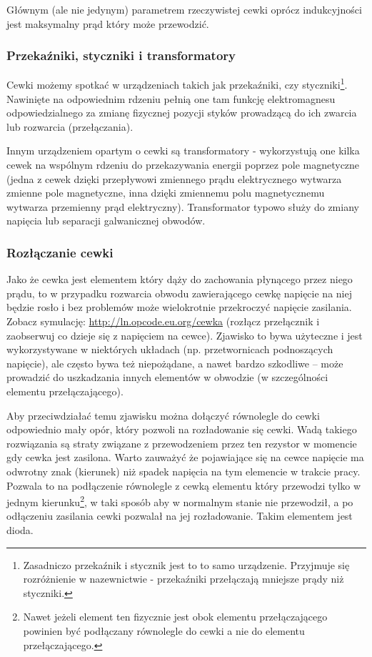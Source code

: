 Głównym (ale nie jedynym) parametrem rzeczywistej cewki oprócz indukcyjności jest maksymalny prąd który może przewodzić.

\subsubsection{Przekaźniki, styczniki i transformatory}

Cewki możemy spotkać w urządzeniach takich jak przekaźniki, czy styczniki\footnote{Zasadniczo przekaźnik i stycznik jest to to samo urządzenie. Przyjmuje się rozróżnienie w nazewnictwie - przekaźniki przełączają mniejsze prądy niż styczniki.}.
Nawinięte na odpowiednim rdzeniu pełnią one tam funkcję elektromagnesu odpowiedzialnego za zmianę fizycznej pozycji styków prowadzącą do ich zwarcia lub rozwarcia (przełączania).

Innym urządzeniem opartym o cewki są transformatory - wykorzystują one kilka cewek na wspólnym rdzeniu do przekazywania energii poprzez pole magnetyczne (jedna z cewek dzięki przepływowi zmiennego prądu elektrycznego wytwarza zmienne pole magnetyczne, inna dzięki zmiennemu polu magnetycznemu wytwarza przemienny prąd elektryczny). Transformator typowo służy do zmiany napięcia lub separacji galwanicznej obwodów.

\subsubsection{Rozłączanie cewki}

Jako że cewka jest elementem który dąży do zachowania płynącego przez niego prądu, to w przypadku rozwarcia obwodu zawierającego cewkę napięcie na niej będzie rosło i bez problemów może wielokrotnie przekroczyć napięcie zasilania.
Zobacz symulację: \url{http://ln.opcode.eu.org/cewka} (rozłącz przełącznik i zaobserwuj co dzieje się z napięciem na cewce).
Zjawisko to bywa użyteczne i jest wykorzystywane w niektórych układach (np. przetwornicach podnoszących napięcie), ale często bywa też niepożądane, a nawet bardzo szkodliwe – może prowadzić do uszkadzania innych elementów w obwodzie (w szczególności elementu przełączającego).

Aby przeciwdziałać temu zjawisku można dołączyć równolegle do cewki odpowiednio mały opór, który pozwoli na rozładowanie się cewki.
Wadą takiego rozwiązania są straty związane z przewodzeniem przez ten rezystor w momencie gdy cewka jest zasilona.
Warto zauważyć że pojawiające się na cewce napięcie ma odwrotny znak (kierunek) niż spadek napięcia na tym elemencie w trakcie pracy.
Pozwala to na podłączenie równolegle z cewką elementu który przewodzi tylko w jednym kierunku\footnote{
	Nawet jeżeli element ten fizycznie jest obok elementu przełączającego powinien być podłączany równolegle do cewki a nie do elementu przełączającego.
}, w taki sposób aby w normalnym stanie nie przewodził, a po odłączeniu zasilania cewki pozwalał na jej rozładowanie.
Takim elementem jest dioda.
